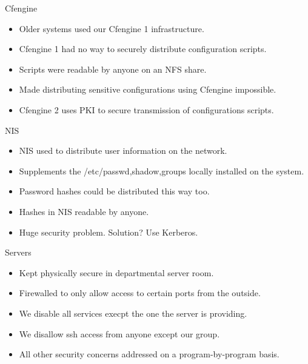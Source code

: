 \documentclass[default,pdf,colorBG,slideColor]{prosper}
\begin{document}
\begin{slide}{Cfengine}
\begin{itemize}
\item Older systems used our Cfengine 1 infrastructure.
\item Cfengine 1 had no way to securely distribute configuration scripts.
\item Scripts were readable by anyone on an NFS share.
\item Made distributing sensitive configurations using Cfengine impossible.
%
\item Cfengine 2 uses PKI to secure transmission of configurations scripts.
\end{itemize}
\end{slide}

\begin{slide}{NIS}
\begin{itemize}
\item NIS used to distribute user information on the network.
\item Supplements the /etc/{passwd,shadow,groups} locally installed on the system.
\item Password hashes could be distributed this way too.
\item Hashes in NIS readable by anyone.
\item Huge security problem.  Solution?  Use Kerberos.
\end{itemize}
\end{slide}

\begin{slide}{Servers}
\begin{itemize}
\item Kept physically secure in departmental server room.
\item Firewalled to only allow access to certain ports from the outside.
\item We disable all services execpt the one the server is providing.
\item We disallow ssh access from anyone except our group.
\item All other security concerns addressed on a program-by-program basis.
\end{itemize}
\end{slide}
\end{document}
